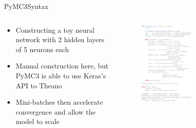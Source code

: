 \documentclass[AERbeamer%
              ,optEnglish%
              ,optBiber%
              ,optBibstyleAlphabetic%
              ,optBeamerClassicFormat%
              ]{AERlatex}%
\begin{document}
\begin{frame}[c]{PyMC3}{Syntax}
    \centering
    \begin{columns}[T]
        \begin{column}{0.4\textwidth}
            \centering
            \begin{itemize}
                \item Constructing a toy neural network with 2 hidden layers of 5 neurons each
                \item Manual construction here, but PyMC3 is able to use Keras's API to Theano
                \item Mini-batches then accelerate convergence and allow the model to scale
            \end{itemize}
        \end{column}
        \begin{column}{0.58\textwidth}
            \centering
            \begin{figure}
                \centering
                \includegraphics[width=0.54\textwidth]{PyMC3Syntax.png}
            \end{figure}
        \end{column}
    \end{columns}
\end{frame}
\end{document}
